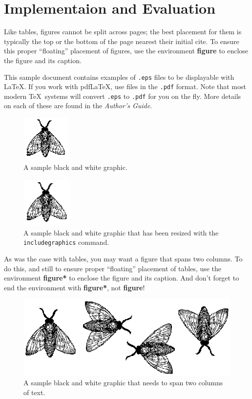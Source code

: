 \section{Implementaion and Evaluation}

Like tables, figures cannot be split across pages; the best placement
for them is typically the top or the bottom of the page nearest their
initial cite.  To ensure this proper ``floating'' placement of
figures, use the environment \textbf{figure} to enclose the figure and
its caption.

This sample document contains examples of \texttt{.eps} files to be
displayable with \LaTeX.  If you work with pdf\LaTeX, use files in the
\texttt{.pdf} format.  Note that most modern \TeX\ systems will convert
\texttt{.eps} to \texttt{.pdf} for you on the fly.  More details on
each of these are found in the \textit{Author's Guide}.

\begin{figure}
\includegraphics{fly}
\caption{A sample black and white graphic.}
\end{figure}

\begin{figure}
\includegraphics[height=1in, width=1in]{fly}
\caption{A sample black and white graphic
that has been resized with the \texttt{includegraphics} command.}
\end{figure}


As was the case with tables, you may want a figure that spans two
columns.  To do this, and still to ensure proper ``floating''
placement of tables, use the environment \textbf{figure*} to enclose
the figure and its caption.  And don't forget to end the environment
with \textbf{figure*}, not \textbf{figure}!

\begin{figure}
\includegraphics{flies}
\caption{A sample black and white graphic
that needs to span two columns of text.}
\end{figure}


